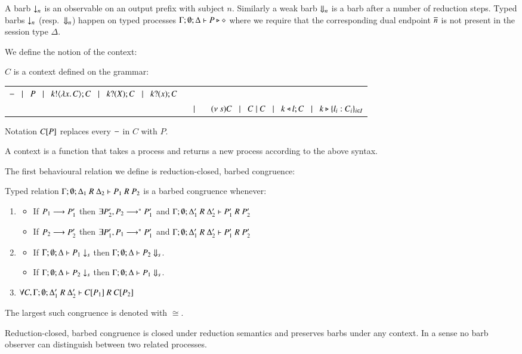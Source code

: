 A barb $\downarrow_{n}$ is an observable on an output prefix with subject $n$.
Similarly a weak barb $\Downarrow_{n}$ is a barb after a number of reduction steps.
Typed barbs $\downarrow_{n}$ (resp.\ $\Downarrow_{n}$)
happen on typed processes $\Gamma; \emptyset; \Delta \vdash P \triangleright \diamond$
where we require that the corresponding dual endpoint $\overline{n}$ is not present
in the session type $\Delta$.

We define the notion of the context:

\begin{definition}[Context]\rm
	$C$ is a context defined on the grammar:

	\begin{tabular}{rcl}
		$- \;\;\;|\;\;\; P \;\;\;|\;\;\; k ! \langle \lambda x.\,C \rangle ; C \;\;\;|\;\;\; k ? (X) ; C \;\;\;|\;\;\; k ? (x) ; C$ \\
		& $\;\;\;|\;\;\;$ & $(\nu\ s) C \;\;\;|\;\;\; C \;|\; C \;\;\;|\;\;\; k \triangleleft l ; C \;\;\;|\;\;\; k \triangleright \{l_i:C_i\}_{i \in I}$
	\end{tabular}

	Notation $C[P]$ replaces every $-$ in $C$ with $P$.
\end{definition}

A context is a function that takes a process and returns a new process
according to the above syntax.

The first behavioural relation we define is reduction-closed, barbed congruence:
%
\begin{definition}\rm
	Typed relation
	$\horel{\Gamma}{\Delta_1}{P_1}{\ R\ }{\Delta_2}{P_2}$
	is a barbed congruence whenever:
	\begin{enumerate}
		\item
		\begin{itemize}
			\item	If $P_1 \longrightarrow P_1'$ then $\exists P_2', P_2 \longrightarrow^* P_1'$ and
				$\horel{\Gamma}{\Delta_1'}{P_1'}{\ R\ }{\Delta_2'}{P_2'}$
			\item	If $P_2 \longrightarrow P_2'$ then $\exists P_1', P_1 \longrightarrow^* P_1'$ and
				$\horel{\Gamma}{\Delta_1'}{P_1'}{\ R\ }{\Delta_2'}{P_2'}$
		\end{itemize}

		\item
		\begin{itemize}
			\item	If $\Gamma;\emptyset;\Delta \vdash P_1 \downarrow_{s}$ then $\Gamma;\emptyset;\Delta \vdash P_2 \Downarrow_{s}$.
			\item	If $\Gamma;\emptyset;\Delta \vdash P_2 \downarrow_{s}$ then $\Gamma;\emptyset;\Delta \vdash P_1 \Downarrow_{s}$.
		\end{itemize}

		\item	$\forall C, \horel{\Gamma}{\Delta_1'}{\context{C}{P_1}}{\ R\ }{\Delta_2'}{\context{C}{P_2}}$
	\end{enumerate}
	The largest such congruence is denoted with $\cong$.
\end{definition}
%
Reduction-closed, barbed congruence is closed under reduction semantics and 
preserves barbs under any context. In a sense no barb observer can distinguish
between two related processes.

